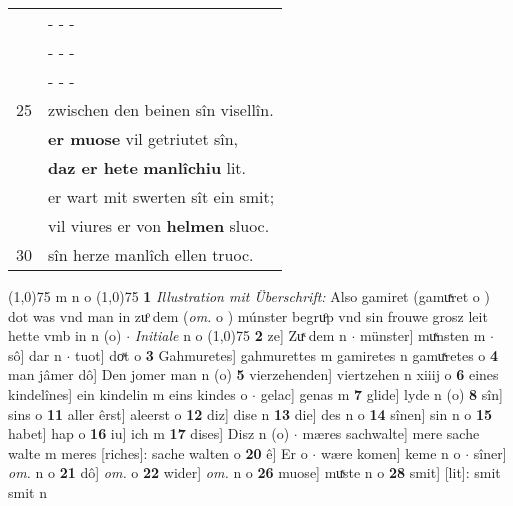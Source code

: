 \documentclass[8pt,a4paper,notitlepage]{article}
\begin{document}
\begin{table}[ht]
\begin{minipage}[t]{0.5\linewidth}
\begin{tabular}{rl}
 & \multicolumn{1}{l}{ - - - }\\ 
 & \multicolumn{1}{l}{ - - - }\\ 
 & \multicolumn{1}{l}{ - - - }\\ 
25 & zwischen den beinen sîn visellîn.\\ 
 & \textbf{er muose} vil getriutet sîn,\\ 
 & \textbf{daz er hete} \textbf{manlîchiu} lit.\\ 
 & er wart mit swerten sît ein smit;\\ 
 & vil viures er von \textbf{helmen} sluoc.\\ 
30 & sîn herze manlîch ellen truoc.\\ 
\end{tabular}
\scriptsize
\line(1,0){75} \newline
m n o \newline
\line(1,0){75} \newline
\textbf{1} \textit{Illustration mit Überschrift:} Also gamiret (gamuͯret o  ) dot was vnd man in zuͦ dem (\textit{om.} o  ) múnster begruͦp vnd sin frouwe grosz leit hette vmb in n (o)   $\cdot$ \textit{Initiale} n o  \newline
\line(1,0){75} \newline
\textbf{2} ze] Zuͯ dem n  $\cdot$ münster] muͯnsten m  $\cdot$ sô] dar n  $\cdot$ tuot] doͯt o \textbf{3} Gahmuretes] gahmurettes m gamiretes n gamuͯretes o \textbf{4} man jâmer dô] Den jomer man n (o) \textbf{5} vierzehenden] viertzehen n xiiij o \textbf{6} eines kindelînes] ein kindelin m eins kindes o  $\cdot$ gelac] genas m \textbf{7} glide] lyde n (o) \textbf{8} sîn] sins o \textbf{11} aller êrst] aleerst o \textbf{12} diz] dise n \textbf{13} die] des n o \textbf{14} sînen] sin n o \textbf{15} habet] hap o \textbf{16} iu] ich m \textbf{17} dises] Disz n (o)  $\cdot$ mæres sachwalte] mere sache walte m meres [riches]: sache walten o \textbf{20} ê] Er o  $\cdot$ wære komen] keme n o  $\cdot$ sîner] \textit{om.} n o \textbf{21} dô] \textit{om.} o \textbf{22} wider] \textit{om.} n o \textbf{26} muose] muͯste n o \textbf{28} smit] [lit]: smit smit n \newline
\end{minipage}
\end{table}
\newpage
\end{document}
